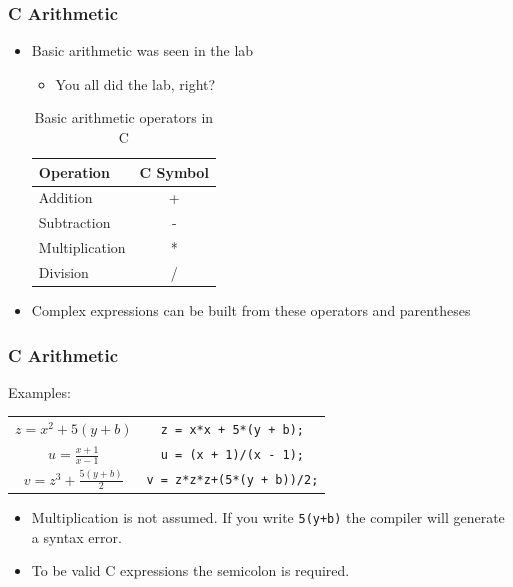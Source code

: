 \documentclass[14pt]{beamer}
\begin{document}
\begin{frame}
\frametitle{C Arithmetic}
\begin{itemize}
\item Basic arithmetic was seen in the lab
\begin{itemize}
\item You all did the lab, right?
\end{itemize}
\begin{table}[H]
\centering
\begin{tabular}{|l|c|}
\hline
Operation      & C Symbol \\
\hline
Addition       & +        \\
Subtraction    & -        \\
Multiplication & *        \\
Division       & /       \\
\hline
\end{tabular}
\caption{Basic arithmetic operators in C}
\end{table}
\item Complex expressions can be built from these operators and parentheses
\end{itemize}
\end{frame}

\begin{frame}
\frametitle{C Arithmetic}
Examples:
\begin{small}
\begin{table}
\centering
\begin{tabular}{cc}
\vspace{2mm}
$z = x^2 + 5(y + b)$ & \texttt{z = x*x + 5*(y + b);} \\
\vspace{2mm}
$u = \frac{x + 1}{x - 1}$ & \texttt{u = (x + 1)/(x - 1);} \\
$v = z^3 + \frac{5(y + b)}{2}$ & \texttt{v = z*z*z+(5*(y + b))/2;} \\
\end{tabular}
\end{table}
\end{small}

\begin{itemize}
\item Multiplication is not assumed. If you write \texttt{5(y+b)} the compiler will generate a syntax error.
\item To be valid C expressions the semicolon is required.
\end{itemize}
\end{frame}
\end{document}
